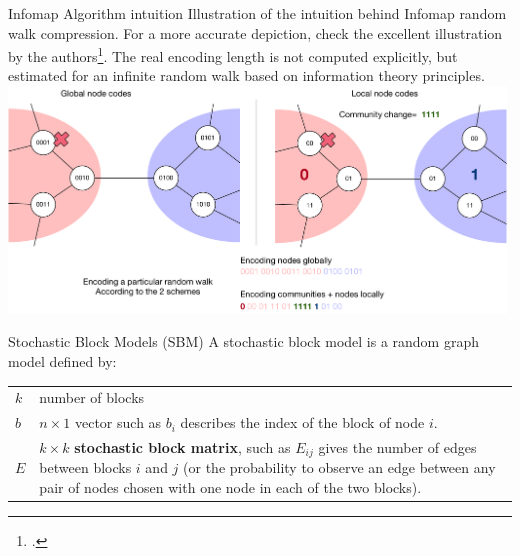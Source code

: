\documentclass[a4paper,11pt]{book}
\begin{document}
\begin{textbox}{Infomap Algorithm intuition}
Illustration of the intuition behind Infomap random walk compression. For a more accurate depiction, check the excellent illustration by the authors\footcite{rosvall2008maps}. The real encoding length is not computed explicitly, but estimated for an infinite random walk based on information theory principles.
\centering
\includegraphics[width=0.99\textwidth]{pics/infomap.pdf}
\end{textbox}





\begin{textbox}{Stochastic Block Models (SBM)}
A stochastic block model is a random graph model defined by:
\begin{tabular}{p{}|p{}}\scriptsize

 $k$ & number of blocks \\ 
 $b$ & $n\times 1$ vector such as $b_i$ describes the index of the block of node $i$. \\
 $E$ & $k\times k$ \textbf{stochastic block matrix}, such as $E_{ij}$ gives the number of edges between blocks $i$ and $j$ (or the probability to observe an edge between any pair of nodes chosen with one node in each of the two blocks).
\end{tabular}
\end{textbox}
\end{document}
